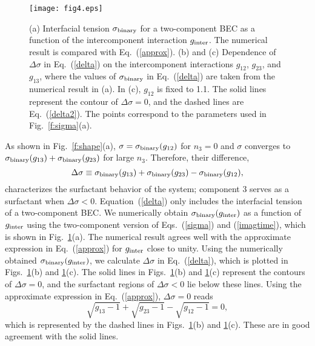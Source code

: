 \documentclass[pra,aps,superscriptaddress,twocolumn,color]{revtex4-1}
\begin{document}
\begin{figure}[tb]
\texttt{[image: fig4.eps]}
\caption{
  (a) Interfacial tension $\sigma_{\rm binary}$ for a two-component BEC as a
  function of the intercomponent interaction $g_{\rm inter}$.
  The numerical result is compared with Eq.~(\ref{approx}).
  (b) and (c) Dependence of $\Delta\sigma$ in Eq.~(\ref{delta}) on the
  intercomponent interactions $g_{12}$, $g_{23}$, and $g_{13}$, where the
  values of $\sigma_{\rm binary}$ in Eq.~(\ref{delta}) are taken from
  the numerical result in (a).
  In (c), $g_{12}$ is fixed to 1.1. 
  The solid lines represent the contour of $\Delta\sigma = 0$, and the
  dashed lines are Eq.~(\ref{delta2}).
  The points correspond to the parameters used in Fig.~\ref{f:sigma}(a).
}
\label{f:delta}
\end{figure}
As shown in Fig.~\ref{f:shape}(a), $\sigma = \sigma_{\rm binary}(g_{12})$
for $n_3 = 0$ and $\sigma$ converges to $\sigma_{\rm binary}(g_{13}) +
\sigma_{\rm binary}(g_{23})$ for large $n_3$. 
Therefore, their difference,
\begin{equation} \label{delta}
  \Delta\sigma \equiv \sigma_{\rm binary}(g_{13})
  + \sigma_{\rm binary}(g_{23}) - \sigma_{\rm binary}(g_{12}),
\end{equation}
characterizes the surfactant behavior of the system;
component 3 serves as a surfactant when $\Delta\sigma < 0$.
Equation~(\ref{delta}) only includes the interfacial tension of a
two-component BEC.
We numerically obtain $\sigma_{\rm binary}(g_{\rm inter})$ as a function of
$g_{\rm inter}$ using the two-component version of Eqs.~(\ref{sigma}) and
(\ref{imagtime}), which is shown in Fig.~\ref{f:delta}(a).
The numerical result agrees well with the approximate expression in
Eq.~(\ref{approx}) for $g_{\rm inter}$ close to unity. 
Using the numerically obtained $\sigma_{\rm binary}(g_{\rm inter})$, we
calculate $\Delta\sigma$ in Eq.~(\ref{delta}), which is plotted in
Figs.~\ref{f:delta}(b) and \ref{f:delta}(c).
The solid lines in Figs.~\ref{f:delta}(b) and \ref{f:delta}(c) represent the
contours of $\Delta\sigma = 0$, and the surfactant regions of $\Delta\sigma
< 0$ lie below these lines.
Using the approximate expression in Eq.~(\ref{approx}), $\Delta \sigma = 0$
reads
\begin{equation} \label{delta2}
\sqrt{g_{13} - 1} + \sqrt{g_{23} - 1} - \sqrt{g_{12} - 1} = 0,
\end{equation}
which is represented by the dashed lines in Figs.~\ref{f:delta}(b) and
\ref{f:delta}(c).
These are in good agreement with the solid lines.
\end{document}
